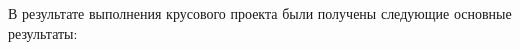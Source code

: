 \Conclusion %

В результате выполнения крусового проекта были получены следующие основные результаты:
